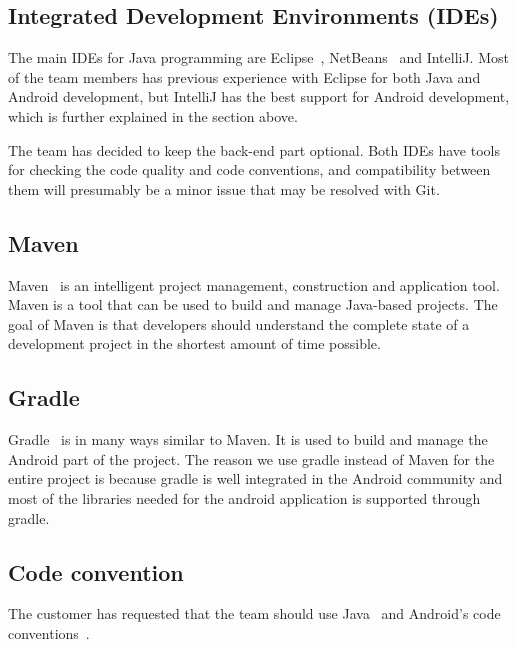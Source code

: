 \subsection{Integrated Development Environments (IDEs)}
The main IDEs for Java programming are Eclipse~\cite{eclipse}, NetBeans~\cite{netbeans} and IntelliJ. Most of the team members has previous experience with Eclipse for both Java and Android development, but IntelliJ has the best support for Android development, which is further explained in the section above.

The team has decided to keep the back-end part optional. Both IDEs have tools for checking the code quality and code conventions, and compatibility between them will presumably be a minor issue that may be resolved with Git.

\subsection{Maven}
Maven~\cite{maven} is an intelligent project management, construction and application tool. Maven is a tool that can be used to build and manage Java-based projects. The goal of Maven is that developers should understand the complete state of a development project in the shortest amount of time possible.

\subsection{Gradle}
Gradle~\cite{gradle} is in many ways similar to Maven. It is used to build and manage the Android part of the project. The reason we use gradle instead of Maven for the entire project is because gradle is well integrated in the Android community and most of the libraries needed for the android application is supported through gradle.

\subsection{Code convention}
The customer has requested that the team should use Java~\cite{javaconv} and Android's code conventions~\cite{androidconv}.
